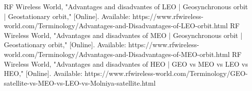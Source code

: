 \documentclass[conference]{IEEEtran}
\begin{document}
\begin{thebibliography}{00}
 RF Wireless World, "Advantages and disadvantes of LEO | Geosynchronous orbit | Geostationary orbit," [Online]. Available: https://www.rfwireless-world.com/Terminology/Advantages-and-Disadvantages-of-LEO-orbit.html
 RF Wireless World, "Advantages and disadvantes of MEO | Geosynchronous orbit | Geostationary orbit," [Online]. Available: https://www.rfwireless-world.com/Terminology/Advantages-and-Disadvantages-of-MEO-orbit.html
 RF Wireless World, "Advantages and disadvantes of HEO | GEO vs MEO vs LEO vs HEO," [Online]. Available: https://www.rfwireless-world.com/Terminology/GEO-satellite-vs-MEO-vs-LEO-vs-Molniya-satellite.html
\end{thebibliography}
\end{document}
